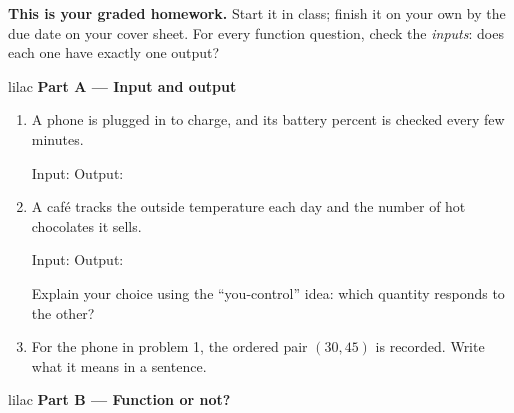 \documentclass[10pt]{article}
\begin{document}

\vspace{0.12in}

\boxguard[8]
\begin{remindbox}
\small
\textbf{This is your graded homework.} Start it in class; finish it on your own by the due
date on your cover sheet. For every function question, check the \emph{inputs}: does each one
have exactly one output?
\end{remindbox}

\vspace{0.12in}

\begin{headlinebox}{lilac}
\textbf{\color{plum}Part A --- Input and output}
\end{headlinebox}

\begin{enumerate}[leftmargin=1.9em, itemsep=8pt]

\item A phone is plugged in to charge, and its battery percent is checked every few minutes.

      Input:  \qquad Output: 

\item A café tracks the outside temperature each day and the number of hot chocolates it sells.

      Input:  \qquad Output: 

      Explain your choice using the ``you-control'' idea: which quantity responds to the other?

\item For the phone in problem 1, the ordered pair $(30, 45)$ is recorded. Write what it means in
      a sentence.

\end{enumerate}

\vspace{0.1in}

\begin{headlinebox}{lilac}
\textbf{\color{plum}Part B --- Function or not?}
\end{headlinebox}
\end{document}
